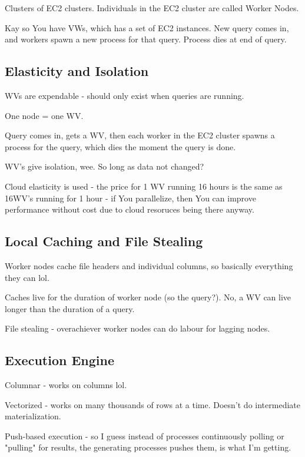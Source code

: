 \documentclass{article}
\begin{document}
		Clusters of EC2 clusters. Individuals in the EC2 cluster are called Worker Nodes.
		
		Kay so You have VWs, which has a set of EC2 instances. New query comes in, and workers spawn a new process for that query. Process dies at end of query.
		

		
	\subsection{Elasticity and Isolation}
	
		WVs are expendable - should only exist when queries are running.
		
		One node = one WV.
		
		Query comes in, gets a WV, then each worker in the EC2 cluster spawns a process for the query, which dies the moment the query is done.
		
		WV's give isolation, wee. So long as data not changed?
		
		Cloud elasticity is used - the price for 1 WV running 16 hours is the same as 16WV's running for 1 hour - if You parallelize, then You can improve performance without cost due to cloud resoruces being there anyway.
		
	\subsection{Local Caching and File Stealing}
	
		Worker nodes cache file headers and individual columns, so basically everything they  can lol.
		
		Caches live for the duration of worker node (so the query?). No, a WV can live longer than the duration of a query.
		
		File stealing - overachiever worker nodes can do labour for lagging nodes.
		
	\subsection{Execution Engine}
	
		Columnar - works on columns lol.
		
		Vectorized - works on many thousands of rows at a time. Doesn't do intermediate materialization.
		
		Push-based execution - so I guess instead of processes continuously polling or "pulling" for results, the generating processes pushes them, is what I'm getting.
		
\end{document}

